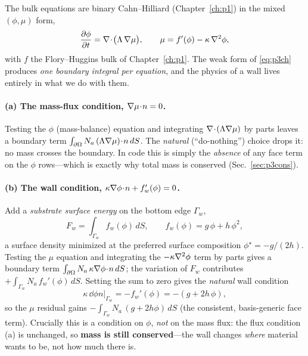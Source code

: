 The bulk equations are binary Cahn--Hilliard (Chapter~\ref{ch:p1}) in the
mixed $(\phi,\mu)$ form,
%
\begin{equation}
  \frac{\partial \phi}{\partial t} = \nabla\!\cdot\!\big(\Lambda\,\nabla\mu\big),
  \qquad
  \mu = f'(\phi) - \kappa\,\nabla^2\phi ,
  \label{eq:p3ch}
\end{equation}
%
with $f$ the Flory--Huggins bulk of Chapter~\ref{ch:p1}. The weak form of
\eqref{eq:p3ch} produces \emph{one boundary integral per equation}, and
the physics of a wall lives entirely in what we do with them.

\paragraph{(a) The mass-flux condition, $\nabla\mu\!\cdot\!n=0$.}
Testing the $\phi$ (mass-balance) equation and integrating
$\nabla\!\cdot\!(\Lambda\nabla\mu)$ by parts leaves a boundary term
$\int_{\partial\Omega} N_a\,(\Lambda\nabla\mu)\!\cdot\!n\,dS$. The
\emph{natural} (``do-nothing'') choice drops it: no mass crosses the
boundary. In code this is simply the \emph{absence} of any face term on
the $\phi$ rows---which is exactly why total mass is conserved
(Sec.~\ref{sec:p3cons}).

\paragraph{(b) The wall condition, $\kappa\nabla\phi\!\cdot\!n+f_w'(\phi)=0$.}
Add a \emph{substrate surface energy} on the bottom edge $\Gamma_w$,
%
\begin{equation}
  F_w = \int_{\Gamma_w} f_w(\phi)\,dS, \qquad
  f_w(\phi) = g\,\phi + h\,\phi^2 ,
  \label{eq:fw}
\end{equation}
%
a surface density minimized at the preferred surface composition
$\phi^\star = -g/(2h)$. Testing the $\mu$ equation and integrating the
$-\kappa\nabla^2\phi$ term by parts gives a boundary term
$\int_{\partial\Omega} N_a\,\kappa\nabla\phi\!\cdot\!n\,dS$; the variation
of $F_w$ contributes $+\int_{\Gamma_w} N_a\,f_w'(\phi)\,dS$. Setting the
sum to zero gives the \emph{natural} wall condition
%
\begin{equation}
  \kappa\,\dd{\phi}{n}\Big|_{\Gamma_w} = -f_w'(\phi) = -(g + 2h\,\phi),
\end{equation}
%
so the $\mu$ residual gains $-\!\int_{\Gamma_w} N_a\,(g+2h\phi)\,dS$
(the consistent, basis-generic face term). Crucially this is a condition
on $\phi$, \emph{not} on the mass flux: the flux condition (a) is
unchanged, so \textbf{mass is still conserved}---the wall changes
\emph{where} material wants to be, not how much there is.


